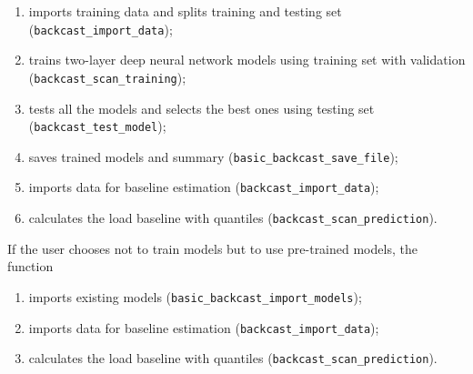 \documentclass[11pt]{article}
\numberwithin{equation}{section}
\numberwithin{table}{section}
\numberwithin{figure}{section}
\begin{document}
\begin{enumerate}
    \item imports training data and splits training and testing set (\verb!backcast_import_data!);
    \item trains two-layer deep neural network models using training set with validation (\verb!backcast_scan_training!);
    \item tests all the models and selects the best ones using testing set (\verb!backcast_test_model!);
    \item saves trained models and summary (\verb!basic_backcast_save_file!);
    \item imports data for baseline estimation (\verb!backcast_import_data!);
    \item calculates the load baseline with quantiles (\verb!backcast_scan_prediction!).
\end{enumerate}

If the user chooses not to train models but to use pre-trained models, the function

\begin{enumerate}
    \item imports existing models (\verb!basic_backcast_import_models!);
    \item imports data for baseline estimation (\verb!backcast_import_data!);
    \item calculates the load baseline with quantiles (\verb!backcast_scan_prediction!).
\end{enumerate}
\end{document}
